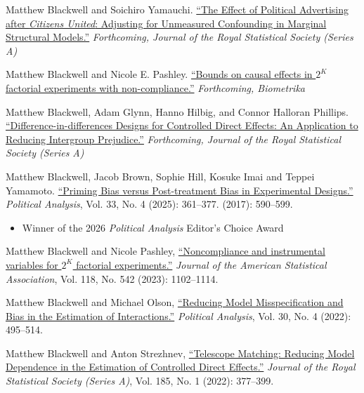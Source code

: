 \documentclass[11pt,article,oneside]{memoir}
\begin{document}
\noindent \begin{etaremune}[  itemsep = 1em,
  topsep = 0em,
  partopsep=0in,
  leftmargin=1.5em]

\item Matthew Blackwell and Soichiro Yamauchi. \href{https://mattblackwell.org/files/papers/psfe.pdf}{``The Effect of Political Advertising after \emph{Citizens United}: Adjusting for Unmeasured Confounding in Marginal Structural Models.''} \emph{Forthcoming, Journal of the Royal Statistical Society (Series A)}

  
\item Matthew Blackwell and Nicole E. Pashley. \href{https://arxiv.org/pdf/2407.12114}{``Bounds on causal effects in $2^K$ factorial experiments with non-compliance.''} \emph{Forthcoming, Biometrika}

  
\item Matthew Blackwell, Adam Glynn, Hanno Hilbig, and Connor Halloran Phillips. \href{https://www.mattblackwell.org/files/papers/did_cde.pdf}{``Difference-in-differences Designs for Controlled Direct Effects: An Application to Reducing Intergroup Prejudice.''} \emph{Forthcoming, Journal of the Royal Statistical Society (Series A)}


\item Matthew Blackwell, Jacob Brown, Sophie Hill, Kosuke Imai and Teppei Yamamoto. \href{https://arxiv.org/pdf/2306.01211}{``Priming Bias versus Post-treatment Bias in Experimental Designs.''} \emph{Political Analysis}, Vol. 33, No. 4 (2025): 361--377.
(2017): 590--599. 
\begin{itemize}[topsep=0em]
\item  Winner of the 2026 \emph{Political Analysis} Editor's Choice Award
\end{itemize}


\item Matthew Blackwell and Nicole Pashley,
\href{https://mattblackwell.org/files/papers/factorial-iv.pdf}{``Noncompliance and instrumental variables for $2^K$ factorial experiments.''} \emph{Journal of the American Statistical Association}, Vol. 118, No. 542 (2023): 1102--1114.


\item Matthew Blackwell and Michael Olson, \href{https://mattblackwell.org/files/papers/lasso-inters.pdf}{``Reducing Model Misspecification and Bias in the Estimation of Interactions.''} \emph{Political Analysis}, Vol. 30, No. 4 (2022): 495--514.

\item Matthew Blackwell and Anton Strezhnev, \href{https://mattblackwell.org/files/papers/telescope_matching.pdf}{``Telescope Matching: Reducing Model Dependence in the Estimation of Controlled Direct Effects.''} \emph{Journal of the Royal Statistical Society (Series A)}, Vol. 185, No. 1 (2022): 377--399. 



\end{etaremune}
\end{document}
